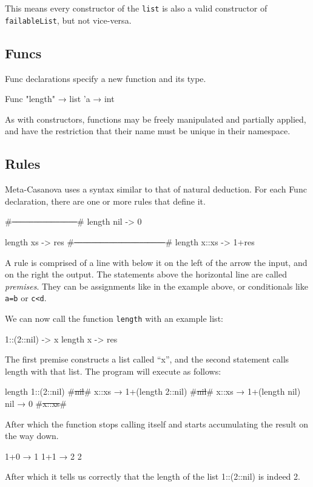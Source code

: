   \noindent
  This means every constructor of the \verb|list| is also a valid constructor of \verb|failableList|, but not vice-versa.

  \subsection{Funcs}
  Func declarations specify a new function and its type.

  \begin{code}
  Func "length" → list 'a → int
  \end{code}

  As with constructors, functions may be freely manipulated and partially applied, and have the restriction that their name must be unique in their namespace.

  \subsection{Rules}
  Meta-Casanova uses a syntax similar to that of natural deduction.
  For each Func declaration, there are one or more rules that define it.

  \begin{code}
  #\verb|───────────────|#
  length nil -> 0

  length xs -> res
  #\verb|─────────────────────|#
  length x::xs -> 1+res
  \end{code}
  
  A rule is comprised of a line with below it on the left of the arrow the input, and on the right the output.
  The statements above the horizontal line are called \textit{premises}.
  They can be assignments like in the example above, or conditionals like \verb|a=b| or \verb|c<d|.

  We can now call the function \verb|length| with an example list:

  \begin{code}
    1::(2::nil) -> x
    length x    -> res
  \end{code}

  The first premise constructs a list called ``x'', and the second statement calls length with that list.
  The program will execute as follows:

  \begin{code}
  length 1::(2::nil)
      #\st{nil}#
      x::xs → 1+(length 2::nil)
          #\st{nil}#
          x::xs → 1+(length nil)
              nil → 0
              #\st{x::xs}#
  \end{code}

  \noindent
  After which the function stops calling itself and starts accumulating the result on the way down.
  
  \begin{code}
         1+0 → 1
     1+1 → 2
  2
  \end{code}

  \noindent
  After which it tells us correctly that the length of the list 1::(2::nil) is indeed 2.
